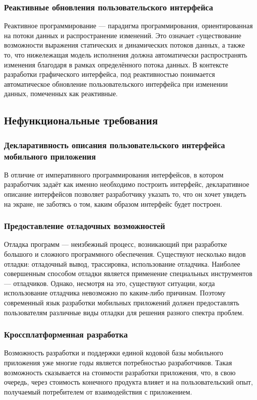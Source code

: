 \subsubsection*{Реактивные обновления пользовательского интерфейса}
Реактивное программирование --- парадигма программирования, ориентированная
на потоки данных и распространение изменений. Это означает cуществование
возможности выражения статических и динамических потоков данных, а также то,
что нижележащая модель исполнения должна автоматически распространять
изменения благодаря в рамках определённого потока данных. В контексте
разработки графического интерфейса, под реактивностью понимается
автоматическое обновление пользовательского интерфейса при изменении
данных, помеченных как реактивные.

\subsection{Нефункциональные требования}
\subsubsection*{Декларативность описания пользовательского интерфейса мобильного приложения}
В отличие от императивного программирования интерфейсов, в котором
разработчик задаёт как именно необходимо построить интерфейс, декларативное
описание интерфейсов позволяет разработчику указать то, что он хочет увидеть
на экране, не заботясь о том, каким образом интерфейс будет построен.

\subsubsection*{Предоставление отладочных возможностей}
Отладка программ --- неизбежный процесс, возникающий при разработке
большого и сложного программного обеспечения. Существуют несколько видов
отладки: отладочный вывод, трассировка, использование отладчика.
Наиболее совершенным способом отладки является применение
специальных инструментов --- отладчиков. Однако, несмотря на это,
существуют ситуации, когда использование отладчика невозможно по каким-либо
причинам. Поэтому современный язык разработки мобильных приложений должен
предоставлять пользователям различные виды отладки для решения разного
спектра проблем.

\subsubsection*{Кроссплатформенная разработка}
Возможность разработки и поддержки единой кодовой базы мобильного приложения
уже многие годы является потребностью разработчиков. Такая возможность
сказывается на стоимости разработки приложения, что, в свою очередь,
через стоимость конечного продукта влияет и на пользовательский опыт,
получаемый потребителем от взаимодействия с приложением.

